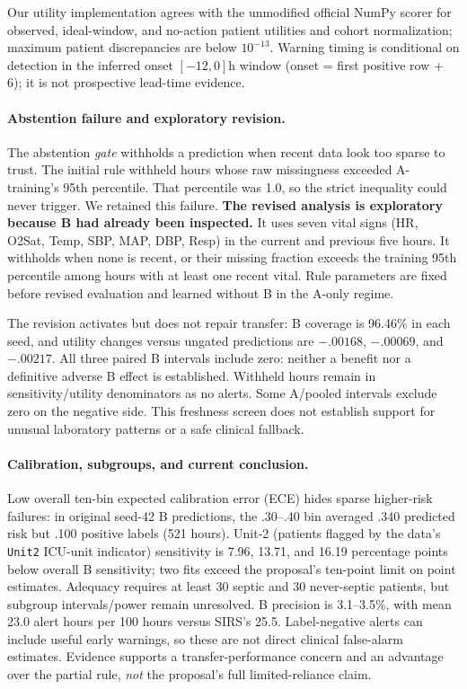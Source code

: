 \documentclass{article}
\begin{document}
Our utility implementation agrees with the unmodified official NumPy scorer \citep{scorer} for observed, ideal-window, and no-action patient utilities and cohort normalization; maximum patient discrepancies are below $10^{-13}$. Warning timing is conditional on detection in the inferred onset $[-12,0]$h window (onset = first positive row + 6); it is not prospective lead-time evidence.

\paragraph{Abstention failure and exploratory revision.}
The abstention \emph{gate} withholds a prediction when recent data look too sparse to trust. The initial rule withheld hours whose raw missingness exceeded A-training's 95th percentile. That percentile was 1.0, so the strict inequality could never trigger. We retained this failure. \textbf{The revised analysis is exploratory because B had already been inspected.} It uses seven vital signs (HR, O2Sat, Temp, SBP, MAP, DBP, Resp) in the current and previous five hours. It withholds when none is recent, or their missing fraction exceeds the training 95th percentile among hours with at least one recent vital. Rule parameters are fixed before revised evaluation and learned without B in the A-only regime.

The revision activates but does not repair transfer: B coverage is 96.46\% in each seed, and utility changes versus ungated predictions are $-.00168$, $-.00069$, and $-.00217$. All three paired B intervals include zero: neither a benefit nor a definitive adverse B effect is established. Withheld hours remain in sensitivity/utility denominators as no alerts. Some A/pooled intervals exclude zero on the negative side. This freshness screen does not establish support for unusual laboratory patterns or a safe clinical fallback.

\paragraph{Calibration, subgroups, and current conclusion.}
Low overall ten-bin expected calibration error (ECE) hides sparse higher-risk failures: in original seed-42 B predictions, the .30--.40 bin averaged .340 predicted risk but .100 positive labels (521 hours). Unit-2 (patients flagged by the data's \texttt{Unit2} ICU-unit indicator) sensitivity is 7.96, 13.71, and 16.19 percentage points below overall B sensitivity; two fits exceed the proposal's ten-point limit on point estimates. Adequacy requires at least 30 septic and 30 never-septic patients, but subgroup intervals/power remain unresolved. B precision is 3.1--3.5\%, with mean 23.0 alert hours per 100 hours versus SIRS's 25.5. Label-negative alerts can include useful early warnings, so these are not direct clinical false-alarm estimates. Evidence supports a transfer-performance concern and an advantage over the partial rule, \emph{not} the proposal's full limited-reliance claim.
\end{document}

